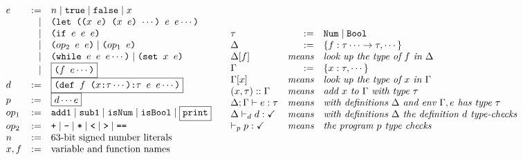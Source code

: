 \documentclass[10pt, oneside]{article}
\begin{document}
\[
\begin{array}{ll}
\begin{array}{lrl}
e & := & n \mid \texttt{true} \mid \texttt{false} \mid x \\
  & \mid  & \texttt{(let (($x\ e$) ($x\ e$) $\cdots$) $e\ e \cdots$)} \\
  & \mid  & \texttt{(if $e\ e \ e$)} \\
  & \mid  & \texttt{($op_2$ $e\ e$)} \mid \texttt{($op_1$ $e$)} \\
  & \mid  & \texttt{(while $e\ e\ e \cdots$)} \mid \texttt{(set $x\ e$)} \\
  & \mid  & \fbox{\texttt{($f\ e\cdots$)}} \\
d & := & \fbox{\texttt{(def $f$ ($x$:$\tau \cdots$):$\tau$ $e\ e \cdots$)}} \\
p & := & \fbox{$d \cdots e$} \\
op_1 & := & \texttt{add1} \mid \texttt{sub1} \mid \texttt{isNum} \mid \texttt{isBool} \mid \fbox{\texttt{print}} \\
op_2 & := & \texttt{+} \mid \texttt{-} \mid \texttt{*} \mid \texttt{<} \mid \texttt{>} \mid \texttt{==} \\
n & := & \textrm{63-bit signed number literals} \\
x,f & := & \textrm{variable and function names} \\
\end{array}
&
\begin{array}{lrl}
\tau & := & \texttt{Num} \mid \texttt{Bool} \\
\Delta & := & \{f: \tau \cdots \rightarrow \tau, \cdots\} \\
\Delta[f] & \textit{means} & \textit{look up the type of } f \textit{ in } \Delta \\
\Gamma & := & \{x:\tau,\cdots\} \\
\Gamma[x] & \textit{means} & \textit{look up the type of } x \textit{ in } \Gamma \\
(x,\tau)::\Gamma & \textit{means} & \textit{add } x \textit{ to } \Gamma \textit{ with type } \tau \\
\Delta;\Gamma \vdash e : \tau & \textit{means} & \textit{with definitions } \Delta \textit{ and env } \Gamma, e \textit{ has type } \tau \\
\Delta \vdash_d d : \checkmark & \textit{means} & \textit{with definitions } \Delta \textit{ the definition } d \textit{ type-checks} \\
\vdash_p p : \checkmark & \textit{means} & \textit{the program } p \textit{ type checks } \\
\end{array}
\end{array}
\]
\end{document}
